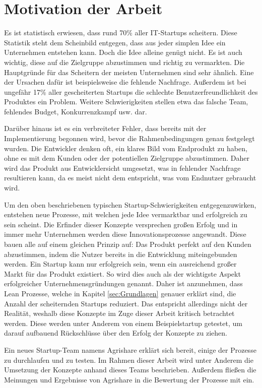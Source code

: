 \section{Motivation der Arbeit}
Es ist statistisch erwiesen, dass rund 70\% aller IT-Startups scheitern. \cite{CBInsights_failure} Diese Statistik steht dem Scheinbild entgegen, dass aus jeder simplen Idee ein Unternehmen entstehen kann. Doch die Idee alleine genügt nicht. Es ist auch wichtig, diese auf die Zielgruppe abzustimmen und richtig zu vermarkten. Die Hauptgründe für das Scheitern der meisten Unternehmen sind sehr ähnlich. Eine der Ursachen dafür ist beispielsweise die fehlende Nachfrage. Außerdem ist bei ungefähr 17\% aller gescheiterten Startups die schlechte Benutzerfreundlichkeit des Produktes ein Problem. Weitere Schwierigkeiten stellen etwa das falsche Team, fehlendes Budget, Konkurrenzkampf usw. dar. \cite{CBInsights_reasons}

Darüber hinaus ist es ein verbreiteter Fehler, dass bereits mit der Implementierung begonnen wird, bevor die Rahmenbedingungen genau festgelegt wurden. Die Entwickler denken oft, ein klares Bild vom Endprodukt zu haben, ohne es mit dem Kunden oder der potentiellen Zielgruppe abzustimmen. Daher wird das Produkt aus Entwicklersicht umgesetzt, was in fehlender Nachfrage resultieren kann, da es meist nicht dem entspricht, was vom Endnutzer gebraucht wird.

Um den oben beschriebenen typischen Startup-Schwierigkeiten entgegenzuwirken, entstehen neue Prozesse, mit welchen jede Idee vermarktbar und erfolgreich zu sein scheint. Die Erfinder dieser Konzepte versprechen großen Erfolg und in immer mehr Unternehmen werden diese Innovationsprozesse angewandt. Diese bauen alle auf einem gleichen Prinzip auf: Das Produkt perfekt auf den Kunden abzustimmen, indem die Nutzer bereits in die Entwicklung miteingebunden werden. Ein Startup kann nur erfolgreich sein, wenn ein ausreichend großer Markt für das Produkt existiert. So wird dies auch als der wichtigste Aspekt erfolgreicher Unternehmensgründungen genannt. Daher ist anzunehmen, dass Lean Prozesse, welche in Kapitel \ref{sec:Grundlagen} genauer erklärt sind, die Anzahl der scheiternden Startups reduziert. Das entspricht allerdings nicht der Realität, weshalb diese Konzepte im Zuge dieser Arbeit kritisch betrachtet werden.\cite{patel201590} Diese werden unter Anderem von einem Beispielstartup getestet, um darauf aufbauend Rückschlüsse über den Erfolg der Konzepte zu ziehen.

Ein neues Startup-Team namens Agrishare erklärt sich bereit, einige der Prozesse zu durchlaufen und zu testen. Im Rahmen dieser Arbeit wird unter Anderem die Umsetzung der Konzepte anhand dieses Teams beschrieben. Außerdem fließen die Meinungen und Ergebnisse von Agrishare in die Bewertung der Prozesse mit ein.

